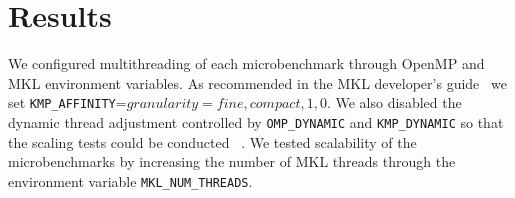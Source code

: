 
\section{Results}
%
We configured multithreading of each microbenchmark through OpenMP and MKL
  environment variables.
As recommended in the MKL developer's guide~\cite{intel:mkl2017} we set
  \texttt{KMP\_AFFINITY}=$granularity=fine,compact,1,0$.
We also disabled the dynamic thread adjustment controlled by
  \texttt{OMP\_DYNAMIC} and \texttt{KMP\_DYNAMIC} so that the scaling tests
  could be conducted
  ~\cite{intel:cpp2015, intel:cpp2017, intel:mkl11_2, intel:mkl2017}.
We tested scalability of the microbenchmarks by increasing the number of MKL
  threads through the environment variable \texttt{MKL\_NUM\_THREADS}.

